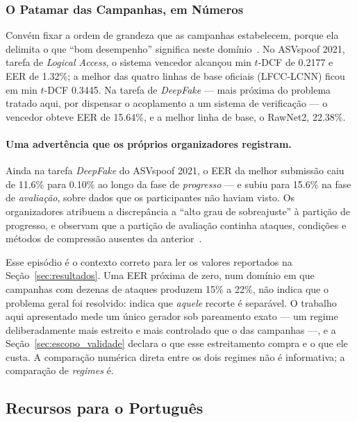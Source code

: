 \documentclass[12pt,a4paper]{article}
\begin{document}
\subsubsection*{O Patamar das Campanhas, em Números}

Convém fixar a ordem de grandeza que as campanhas estabelecem, porque ela
delimita o que ``bom desempenho'' significa neste
domínio~\cite{yamagishi2021asvspoof}. No ASVspoof 2021, tarefa de
\textit{Logical Access}, o sistema vencedor alcançou min $t$-DCF de
\num{0,2177} e EER de \num{1,32}\%; a melhor das quatro linhas de base
oficiais (LFCC-LCNN) ficou em min $t$-DCF \num{0,3445}. Na tarefa de
\textit{DeepFake} --- mais próxima do problema tratado aqui, por dispensar o
acoplamento a um sistema de verificação --- o vencedor obteve EER de
\num{15,64}\%, e a melhor linha de base, o RawNet2, \num{22,38}\%.

\paragraph{Uma advertência que os próprios organizadores registram.} Ainda na
tarefa \textit{DeepFake} do ASVspoof 2021, o EER da melhor submissão caiu de
\num{11,6}\% para \num{0,10}\% ao longo da fase de \emph{progresso} --- e
subiu para \num{15,6}\% na fase de \emph{avaliação}, sobre dados que os
participantes não haviam visto. Os organizadores atribuem a discrepância a
``alto grau de sobreajuste'' à partição de progresso, e observam que a
partição de avaliação continha ataques, condições e métodos de compressão
ausentes da anterior~\cite{yamagishi2021asvspoof}.

Esse episódio é o contexto correto para ler os valores reportados na
Seção~\ref{sec:resultados}. Uma EER próxima de zero, num domínio em que
campanhas com dezenas de ataques produzem \num{15}\% a \num{22}\%, não indica
que o problema geral foi resolvido: indica que \emph{aquele} recorte é
separável. O trabalho aqui apresentado mede um único gerador sob pareamento
exato --- um regime deliberadamente mais estreito e mais controlado que o das
campanhas ---, e a Seção~\ref{sec:escopo_validade} declara o que esse
estreitamento compra e o que ele custa. A comparação numérica direta entre os
dois regimes não é informativa; a comparação de \emph{regimes} é.

\subsection{Recursos para o Português}
\end{document}
